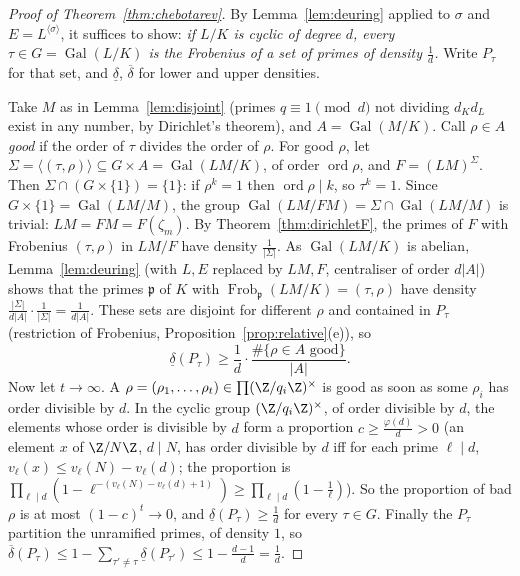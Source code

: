 \begin{proof}[Proof of Theorem~\ref{thm:chebotarev}]
By Lemma~\ref{lem:deuring} applied to $\sigma$ and $E=L^{\langle\sigma\rangle}$, it suffices to show: \emph{if $L/K$ is cyclic of degree $d$, every
$\tau\in G=\operatorname{Gal}(L/K)$ is the Frobenius of a set of primes of density $\frac1d$.} Write $P_\tau$ for that set, and $\underline\delta$,
$\overline\delta$ for lower and upper densities.

Take $M$ as in Lemma~\ref{lem:disjoint} (primes $q\equiv1\pmod d$ not dividing $d_Kd_L$ exist in any number, by Dirichlet's theorem), and
$A=\operatorname{Gal}(M/K)$. Call $\rho\in A$ \emph{good} if the order of $\tau$ divides the order of $\rho$. For good $\rho$, let $\Sigma=\langle
(\tau,\rho)\rangle\subseteq G\times A=\operatorname{Gal}(LM/K)$, of order $\operatorname{ord}\rho$, and $F=(LM)^\Sigma$. Then $\Sigma\cap
(G\times\{1\})=\{1\}$: if $\rho^k=1$ then $\operatorname{ord}\rho\mid k$, so $\tau^k=1$. Since $G\times\{1\}=\operatorname{Gal}(LM/M)$, the
group $\operatorname{Gal}(LM/FM)=\Sigma\cap\operatorname{Gal}(LM/M)$ is trivial: $LM=FM=F(\zeta_m)$. By Theorem~\ref{thm:dirichletF}, the primes of
$F$ with Frobenius $(\tau,\rho)$ in $LM/F$ have density $\frac1{|\Sigma|}$. As $\operatorname{Gal}(LM/K)$ is abelian, Lemma~\ref{lem:deuring}
(with $L,E$ replaced by $LM,F$, centraliser of order $d|A|$) shows that the primes $\mathfrak p$ of $K$ with $\operatorname{Frob}_{\mathfrak
p}(LM/K)=(\tau,\rho)$ have density $\frac{|\Sigma|}{d|A|}\cdot\frac1{|\Sigma|}=\frac1{d|A|}$. These sets are disjoint for different $\rho$ and
contained in $P_\tau$ (restriction of Frobenius, Proposition~\ref{prop:relative}(e)), so
\[
\underline\delta(P_\tau)\ge\frac1d\cdot\frac{\#\{\rho\in A\text{ good}\}}{|A|}.
\]
Now let $t\to\infty$. A $\rho=(\rho_1,\dots,\rho_t)\in\prod(\Z/q_i\Z)^\times$ is good as soon as some $\rho_i$ has order divisible by $d$. In the
cyclic group $(\Z/q_i\Z)^\times$, of order divisible by $d$, the elements whose order is divisible by $d$ form a proportion $c\ge\frac{\varphi(d)}d>0$
(an element $x$ of $\Z/N\Z$, $d\mid N$, has order divisible by $d$ iff for each prime $\ell\mid d$, $v_\ell(x)\le v_\ell(N)-v_\ell(d)$; the
proportion is $\prod_{\ell\mid d}(1-\ell^{-(v_\ell(N)-v_\ell(d)+1)})\ge\prod_{\ell\mid d}(1-\frac1\ell)$). So the proportion of bad $\rho$ is at
most $(1-c)^t\to0$, and $\underline\delta(P_\tau)\ge\frac1d$ for every $\tau\in G$. Finally the $P_\tau$ partition the unramified primes, of
density $1$, so $\overline\delta(P_\tau)\le1-\sum_{\tau'\ne\tau}\underline\delta(P_{\tau'})\le1-\frac{d-1}d=\frac1d$.
\end{proof}

